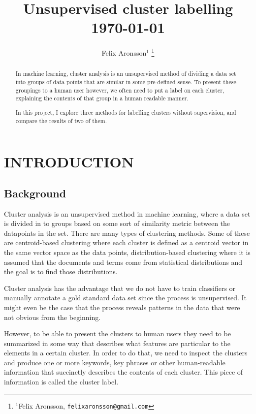 \documentclass[letterpaper, 10 pt, conference]{ieeeconf}
\title{
{\LARGE \bf Unsupervised cluster labelling} \\
{\small \today}
}
\author{Felix Aronsson$^{1}$%
\thanks{$^{1}$Felix Aronsson, {\tt\small felixaronsson@gmail.com}}%
}
\begin{document}
\maketitle
\thispagestyle{empty}
\pagestyle{empty}

\begin{abstract}

In machine learning, cluster analysis is an unsupervised method of dividing a
data set into groups of data points that are similar in some pre-defined sense.
To present these groupings to a human user however, we often need to put a label
on each cluster, explaining the contents of that group in a human readable
manner.

In this project, I explore three methods for labelling clusters without
supervision, and compare the results of two of them.

\end{abstract}

\section{INTRODUCTION}

\subsection{Background}
Cluster analysis is an unsupervised method in machine learning, where a data set
is divided in to groups based on some sort of similarity metric between the
datapoints in the set. There are many types of clustering methods. Some of these
are centroid-based clustering where each cluster is defined as a centroid vector
in the same vector space as the data points, distribution-based clustering where
it is assumed that the documents and terms come from statistical distributions
and the goal is to find those distributions.

Cluster analysis has the advantage that we do not have to train classifiers or
manually annotate a gold standard data set since the process is unsupervised. It
might even be the case that the process reveals patterns in the data that were
not obvious from the beginning.

However, to be able to present the clusters to human users they need to be
summarized in some way that describes what features are particular to the
elements in a certain cluster. In order to do that, we need to inspect the
clusters and produce one or more keywords, key phrases or other human-readable
information that succinctly describes the contents of each cluster. This piece
of information is called the cluster label.
\end{document}
